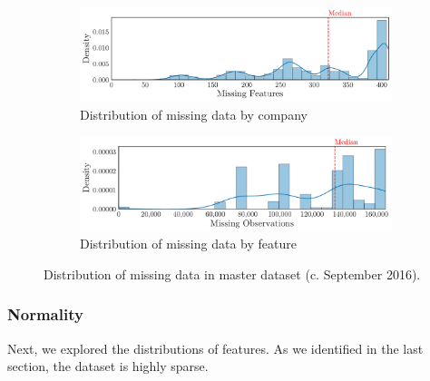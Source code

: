 \documentclass[../thesis/thesis.tex]{subfiles}
\begin{document}
\begin{figure}[!htb]
    \centering
    \begin{subfigure}{\textwidth}
        \includegraphics[width=\textwidth]{../figures/design/sparsity_features}
        \caption{Distribution of missing data by company}
        \label{fig:design:sparsity:features}
    \end{subfigure}
    \begin{subfigure}{\textwidth}
        \includegraphics[width=\textwidth]{../figures/design/sparsity_observations}
        \caption{Distribution of missing data by feature}
        \label{fig:design:sparsity:observations}
    \end{subfigure}
    \caption{Distribution of missing data in master dataset (c. September 2016).}
    \label{fig:design:sparsity}
\end{figure}

\subsubsection{Normality}

Next, we explored the distributions of features. As we identified in the last section, the dataset is highly sparse. %
\end{document}
